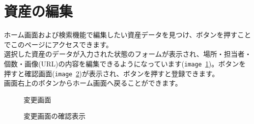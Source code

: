 \documentclass[11ptm]{jsarticle}
\begin{document}
\clearpage
\section{資産の編集}
\label{sec:資産の編集}
ホーム画面および検索機能で編集したい資産データを見つけ、ボタンを押すことでこのページにアクセスできます。\\
選択した資産のデータが入力された状態のフォームが表示され、場所・担当者・個数・画像(URL)の内容を編集できるようになっています({\tt image}\ \ref{fig:変更画面})。ボタンを押すと確認画面({\tt image}\ \ref{fig:変更画面の確認表示})が表示され、ボタンを押すと登録できます。\\
画面右上のボタンからホーム画面へ戻ることができます。
\begin{figure}[h]
  \centering
  \caption{\label{fig:変更画面}変更画面}
\end{figure}
\begin{figure}[h]
  \centering
  \caption{\label{fig:変更画面の確認表示}変更画面の確認表示}
\end{figure}
\end{document}
